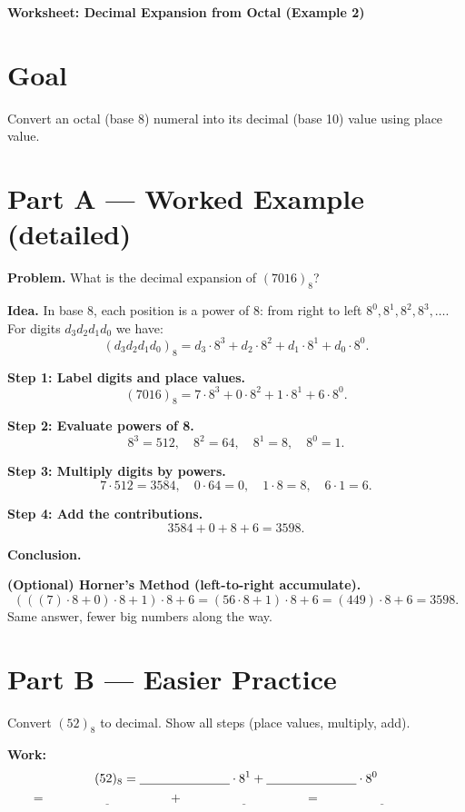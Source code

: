 \documentclass[12pt]{article}
\begin{document}
\begin{center}
\Large\textbf{Worksheet: Decimal Expansion from Octal (Example 2)}
\end{center}

\section*{Goal}
Convert an octal (base 8) numeral into its decimal (base 10) value using place value.

\section*{Part A — Worked Example (detailed)}
\textbf{Problem.} What is the decimal expansion of $(7016)_8$?

\textbf{Idea.} In base $8$, each position is a power of $8$: from right to left
$8^0,8^1,8^2,8^3,\dots$.
For digits $d_3d_2d_1d_0$ we have:
\[
(d_3d_2d_1d_0)_8 = d_3\cdot 8^3 + d_2\cdot 8^2 + d_1\cdot 8^1 + d_0\cdot 8^0.
\]

\textbf{Step 1: Label digits and place values.}
\[
(7016)_8 = 7\cdot 8^3 + 0\cdot 8^2 + 1\cdot 8^1 + 6\cdot 8^0.
\]

\textbf{Step 2: Evaluate powers of 8.}
\[
8^3=512,\quad 8^2=64,\quad 8^1=8,\quad 8^0=1.
\]

\textbf{Step 3: Multiply digits by powers.}
\[
7\cdot 512 = 3584,\quad 0\cdot 64 = 0,\quad 1\cdot 8 = 8,\quad 6\cdot 1 = 6.
\]

\textbf{Step 4: Add the contributions.}
\[
3584 + 0 + 8 + 6 = 3598.
\]

\textbf{Conclusion.} 

\medskip
\textbf{(Optional) Horner’s Method (left-to-right accumulate).}
\[
(((7)\cdot 8 + 0)\cdot 8 + 1)\cdot 8 + 6
= (56\cdot 8 + 1)\cdot 8 + 6 = (449)\cdot 8 + 6 = 3598.
\]
Same answer, fewer big numbers along the way.

\section*{Part B — Easier Practice}
Convert $(52)_8$ to decimal. Show all steps (place values, multiply, add).

\medskip
\textbf{Work:}
\[
(52)_8 = \underline{\hspace{2.5cm}}\cdot 8^1 + \underline{\hspace{2.5cm}}\cdot 8^0
\]
\[
= \underline{\hspace{4cm}} + \underline{\hspace{4cm}} = \underline{\hspace{4cm}}
\]
\end{document}
